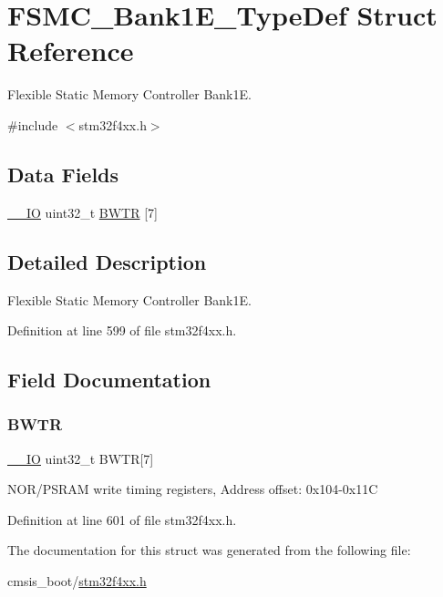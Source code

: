 \hypertarget{struct_f_s_m_c___bank1_e___type_def}{}\section{F\+S\+M\+C\+\_\+\+Bank1\+E\+\_\+\+Type\+Def Struct Reference}
\label{struct_f_s_m_c___bank1_e___type_def}


Flexible Static Memory Controller Bank1E.  




{\ttfamily \#include $<$stm32f4xx.\+h$>$}

\subsection*{Data Fields}
\begin{DoxyCompactItemize}
\item 
\hyperlink{group___c_m_s_i_s__core__definitions_gaec43007d9998a0a0e01faede4133d6be}{\+\_\+\+\_\+\+IO} uint32\+\_\+t \hyperlink{struct_f_s_m_c___bank1_e___type_def_a20f13b79c0f8670af319af0c5ebd5c91}{B\+W\+TR} \mbox{[}7\mbox{]}
\end{DoxyCompactItemize}


\subsection{Detailed Description}
Flexible Static Memory Controller Bank1E. 

Definition at line 599 of file stm32f4xx.\+h.



\subsection{Field Documentation}
\mbox{\label{struct_f_s_m_c___bank1_e___type_def_a20f13b79c0f8670af319af0c5ebd5c91}} 
\subsubsection{\texorpdfstring{B\+W\+TR}{BWTR}}
{\footnotesize\ttfamily \hyperlink{group___c_m_s_i_s__core__definitions_gaec43007d9998a0a0e01faede4133d6be}{\+\_\+\+\_\+\+IO} uint32\+\_\+t B\+W\+TR\mbox{[}7\mbox{]}}

N\+O\+R/\+P\+S\+R\+AM write timing registers, Address offset\+: 0x104-\/0x11C 

Definition at line 601 of file stm32f4xx.\+h.



The documentation for this struct was generated from the following file\+:\begin{DoxyCompactItemize}
\item 
cmsis\+\_\+boot/\hyperlink{stm32f4xx_8h}{stm32f4xx.\+h}\end{DoxyCompactItemize}

